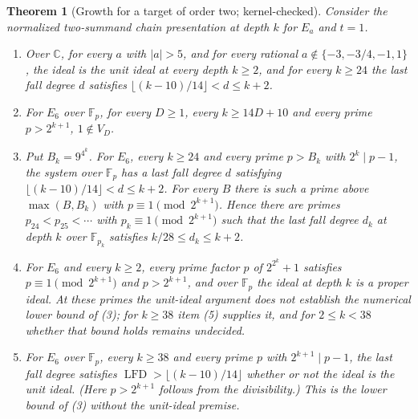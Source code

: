 \documentclass[11pt]{article}
\newtheorem{theorem}{Theorem}
\theoremstyle{definition}\newtheorem{definition}[theorem]{Definition}
\theoremstyle{remark}\newtheorem{remark}[theorem]{Remark}
\newcommand{\F}{\mathbb F}
\newcommand{\lfd}{\operatorname{LFD}}
\begin{document}
\begin{theorem}[Growth for a target of order two; kernel-checked]\label{thm:growthfixed}
Consider the normalized two-summand chain presentation at depth $k$ for
$E_a$ and $t=1$.
\begin{enumerate}
\item Over $\mathbb{C}$, for every $a$ with $|a|>5$, and for every rational
 $a\notin\{-3,-3/4,-1,1\}$, the ideal is the unit ideal at every depth
 $k\ge2$, and for every $k\ge24$ the last fall degree $d$ satisfies
 $\lfloor(k-10)/14\rfloor<d\le k+2$.
\item For $E_6$ over $\F_p$, for every $D\ge1$, every $k\ge14D+10$ and every
 prime $p>2^{k+1}$, $1\notin V_D$.
\item Put $B_k=9^{4^k}$. For $E_6$, every $k\ge24$ and every prime
 $p>B_k$ with $2^k\mid p-1$, the system over $\F_p$ has a last fall degree
 $d$ satisfying $\lfloor(k-10)/14\rfloor<d\le k+2$. For every $B$ there
 is such a prime above $\max(B,B_k)$ with $p\equiv1\pmod{2^{k+1}}$.
 Hence there are
 primes $p_{24}<p_{25}<\cdots$ with $p_k\equiv1\pmod{2^{k+1}}$ such that
 the last fall degree $d_k$ at depth $k$ over $\F_{p_k}$ satisfies
 $k/28\le d_k\le k+2$.
\item For $E_6$ and every $k\ge2$, every prime factor $p$ of $2^{2^k}+1$
 satisfies $p\equiv1\pmod{2^{k+1}}$ and $p>2^{k+1}$, and over $\F_p$ the
 ideal at depth $k$ is a proper ideal. At these primes the unit-ideal
 argument does not establish the numerical lower bound of (3); for
 $k\ge38$ item (5) supplies it, and for $2\le k<38$ whether that bound
 holds remains undecided.
\item For $E_6$ over $\F_p$, every $k\ge38$ and every prime $p$ with
 $2^{k+1}\mid p-1$, the last fall degree satisfies
 $\lfd>\lfloor(k-10)/14\rfloor$ whether or not the ideal is the unit
 ideal. (Here $p>2^{k+1}$ follows from the divisibility.) This is the
 lower bound of (3) without the unit-ideal premise.
\end{enumerate}
\end{theorem}
\end{document}
